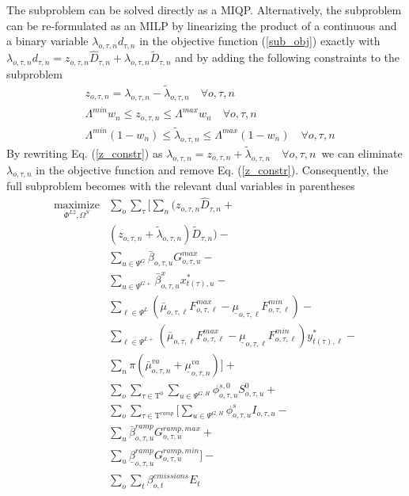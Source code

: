 \documentclass[final]{IEEEtran}
\newcommand{\Tau}{\mathrm{T}}
\begin{document}
The subproblem can be solved directly as a MIQP. Alternatively, the subproblem can be re-formulated as an MILP by linearizing the product of a continuous and a binary variable $\lambda_{o, \tau, n} d_{\tau, n}$ in the objective function (\ref{sub_obj}) exactly with $\lambda_{o, \tau, n} d_{\tau, n} = z_{o, \tau, n} \hat{D}_{\tau, n} + \lambda_{o, \tau, n} \tilde{D}_{\tau, n}$ and by adding the following constraints to the subproblem
\begin{align}
&\label{z_constr} z_{o, \tau, n} = \lambda_{o, \tau, n} - \tilde{\lambda}_{o, \tau, n} \quad \forall o, \tau, n \\
&\Lambda^{min} w_n \leq z_{o, \tau, n} \leq \Lambda^{max} w_n \quad \forall o, \tau, n \\
&\Lambda^{min} (1 - w_n) \leq \tilde{\lambda}_{o, \tau, n} \leq \Lambda^{max} (1 - w_n) \quad \forall o, \tau, n
\end{align}
By rewriting Eq. (\ref{z_constr}) as $\lambda_{o, \tau, n} = z_{o, \tau, n} + \tilde{\lambda}_{o, \tau, n} \quad \forall o, \tau, n$ we can eliminate $\lambda_{o, \tau, n}$ in the objective function and remove Eq. (\ref{z_constr}). Consequently, the full subproblem becomes with the relevant dual variables in parentheses
\begin{align}
\label{subproblem_obj}\underset{\Phi^{L2}, \Omega^{S}}{\text{maximize}} &\sum\limits_o \sum\limits_{\tau} \Bigg[ \sum\limits_n \Big( z_{o, \tau, n} \hat{D}_{\tau, n} + \nonumber \\
&(z_{o, \tau, n} + \tilde{\lambda}_{o, \tau, n}) \tilde{D}_{\tau, n} \Big) - \nonumber \\
&\sum\limits_{u \in \Psi^G} \bar{\beta}_{o, \tau, u} G_{o, \tau, u}^{max} - \nonumber \\
&\sum\limits_{u \in \Psi^{G+}} \bar{\beta}^x_{o, \tau, u} x_{t(\tau), u}^* - \nonumber \\
&\sum\limits_{\ell \in \Psi^L} \left( \bar{\mu}_{o, \tau, \ell} F_{o, \tau, \ell}^{max} - \underline{\mu}_{o, \tau, \ell} F_{o, \tau, \ell}^{min} \right) - \nonumber \\
&\sum\limits_{\ell \in \Psi^{L+}} \left( \bar{\mu}_{o, \tau, \ell} F_{o, \tau, \ell}^{max} - \underline{\mu}_{o, \tau, \ell} F_{o, \tau, \ell}^{min} \right) y_{t(\tau), \ell}^* - \nonumber \\
&\sum\limits_{n} \pi ( \bar{\mu}^{va}_{o, \tau, n} + \underline{\mu}^{va}_{o, \tau, n} ) \Bigg] + \nonumber \\
&\sum\limits_{o} \sum\limits_{\tau \in \Tau^{0}} \sum\limits_{u \in \Psi^{G, H}} \phi_{o, \tau, u}^{s,0} S^{0}_{o, \tau, u} + \nonumber \\
&\sum\limits_{o} \sum\limits_{\tau \in \Tau^{ramp}} \Bigg[ \sum\limits_{u \in \Psi^{G, H}} \phi_{o, \tau, u}^{s} I_{o, \tau, u} - \nonumber \\
&\sum\limits_{u} \bar{\beta}_{o, \tau, u}^{ramp} G^{ramp,max}_{o, \tau, u} + \nonumber \\
&\sum\limits_{u} \underline{\beta}_{o, \tau, u}^{ramp} G^{ramp,min}_{o, \tau, u} \Bigg] - \nonumber \\
&\sum\limits_{o} \sum\limits_{t} \beta_{o, t}^{emissions} E_{t}
\end{align}
\end{document}
